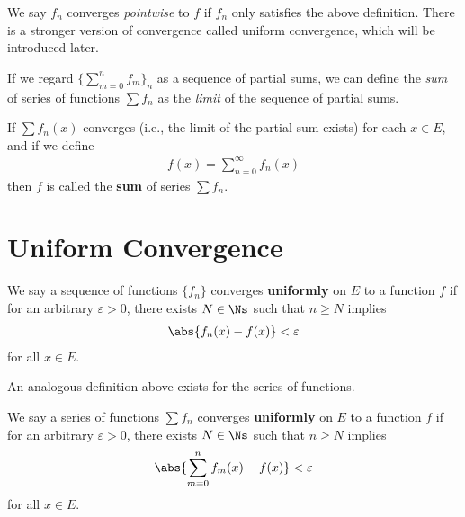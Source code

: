 \documentclass[thmcnt=section, 12pt]{elegantbook}
\begin{document}
\par We say $f_n$ converges \textit{pointwise} to $f$ if $f_n$ only satisfies the above definition. There is a stronger version of convergence called uniform convergence, which will be introduced later.

\par If we regard $\{\sum_{m=0}^{n} f_m\}_n$ as a sequence of partial sums, we can define the \textit{sum} of series of functions $\sum f_n$ as the \textit{limit} of the sequence of partial sums.

\begin{definition} \label{def:2}
    If $\sum f_n(x)$ converges (i.e., the limit of the partial sum exists) for each $x \in E$, and if we define 
    \begin{align*}
        f(x) = \sum_{n=0}^{\infty} f_n(x)
    \end{align*} 
    then $f$ is called the \textbf{sum} of series $\sum f_n$.
\end{definition}


\section{Uniform Convergence}


\begin{definition} \label{def:3}
    We say a sequence of functions $\{f_n\}$ converges \textbf{uniformly} on $E$ to a function $f$ if for an arbitrary $\varepsilon > 0$, there exists $N \in \Ns$ such that $n \geq N$ implies 
    \begin{align*}
        \abs{f_n(x) - f(x)} < \varepsilon
    \end{align*}
    for all $x \in E$.
\end{definition}


\par An analogous definition above exists for the series of functions.

\begin{definition} \label{def:4}
    We say a series of functions $\sum f_n$ converges \textbf{uniformly} on $E$ to a function $f$ if for an arbitrary $\varepsilon > 0$, there exists $N \in \Ns$ such that $n \geq N$ implies 
    \begin{align*}
        \abs{\sum_{m=0}^{n} f_m(x) - f(x)} < \varepsilon
    \end{align*}
    for all $x \in E$.
\end{definition}
\end{document}

